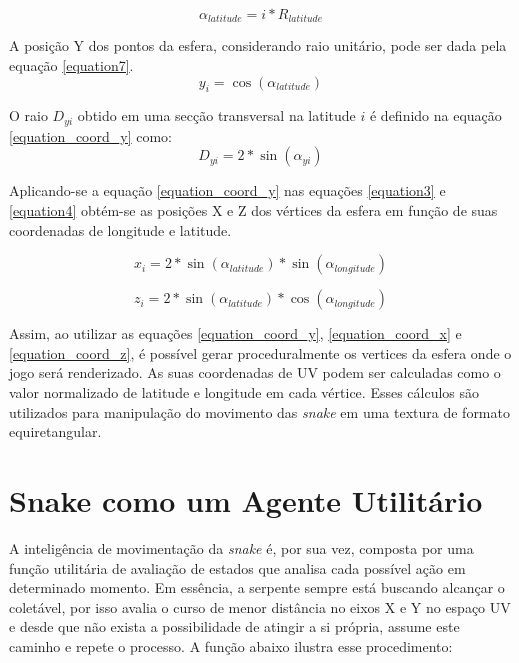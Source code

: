 \documentclass{vgtc}                          %
\begin{document}
\begin{equation}
\alpha_{latitude} = i * R_{latitude}
\label{equation6}
\end{equation}

A posição Y dos pontos da esfera, considerando raio unitário, pode ser dada pela equação \ref{equation7}.
\begin{equation}
y_{i} = \cos(\alpha_{latitude})
\label{equation7}
\end{equation}

O raio $D_{yi}$ obtido em uma secção transversal na latitude $i$ é definido na equação \ref{equation_coord_y} como:
\begin{equation}
D_{yi} = 2 * \sin(\alpha_{yi})
\label{equation_coord_y}
\end{equation}

Aplicando-se a equação \ref{equation_coord_y} nas equações \ref{equation3} e \ref{equation4} obtém-se as posições X e Z dos vértices da esfera em função de suas coordenadas de longitude e latitude.

\begin{equation}
x_{i} = 2 * \sin(\alpha_{latitude}) * \sin(\alpha_{longitude})
\label{equation_coord_x}
\end{equation}

\begin{equation}
z_{i} = 2 * \sin(\alpha_{latitude}) * \cos(\alpha_{longitude})
\label{equation_coord_z}
\end{equation}

Assim, ao utilizar as equações \ref{equation_coord_y}, \ref{equation_coord_x} e \ref{equation_coord_z}, é possível gerar proceduralmente os vertices da esfera onde o jogo será renderizado. As suas coordenadas de UV podem ser calculadas como o valor normalizado de latitude e longitude em cada vértice. Esses cálculos são utilizados para manipulação do movimento das \textit{snake} em uma textura de formato equiretangular.

\section{Snake como um Agente Utilitário} \label{sec:agent}

A inteligência de movimentação da \textit{snake} é, por sua vez, composta por uma função utilitária de avaliação de estados que analisa cada possível ação em determinado momento. Em essência, a serpente sempre está buscando alcançar o coletável, por isso avalia o curso de menor distância no eixos X e Y no espaço UV e desde que não exista a possibilidade de atingir a si própria, assume este caminho e repete o processo. A função abaixo ilustra esse procedimento:
\end{document}
